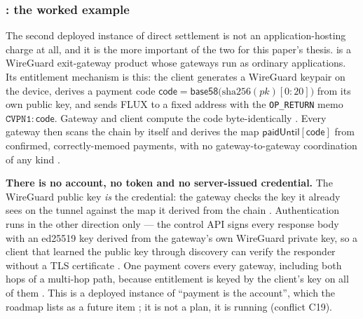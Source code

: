 \subsubsection{\CumulusVPN: the worked example}

The second deployed instance of direct settlement is not an application-hosting charge at all, and it
is the more important of the two for this paper's thesis. \CumulusVPN is a WireGuard exit-gateway
product whose gateways run as ordinary \Flux applications. Its entitlement mechanism is this: the
client generates a WireGuard keypair on the device, derives a payment code
$\mathsf{code} = \mathsf{base58}\bigl(\mathrm{sha256}(pk)[0{:}20]\bigr)$ from its own public key, and
sends FLUX to a fixed address with the \texttt{OP\_RETURN} memo $\texttt{CVPN1:}\,\mathsf{code}$.
Gateway and client compute the code byte-identically
. Every gateway then scans the chain
by itself and derives the map $\mathsf{paidUntil}[\mathsf{code}]$ from confirmed, correctly-memoed
payments, with no gateway-to-gateway coordination of any kind
.

\textbf{There is no account, no token and no server-issued credential.} The WireGuard public key
\emph{is} the credential: the gateway checks the key it already sees on the tunnel against the map it
derived from the chain . Authentication runs
in the other direction only --- the control API signs every response body with an ed25519 key derived
from the gateway's own WireGuard private key, so a client that learned the public key through
discovery can verify the responder without a TLS certificate
. One payment covers every gateway,
including both hops of a multi-hop path, because entitlement is keyed by the client's key on all of
them . This is a deployed instance of ``payment is the
account'', which the roadmap lists as a future item ; it is not a plan, it is
running (conflict C19).

